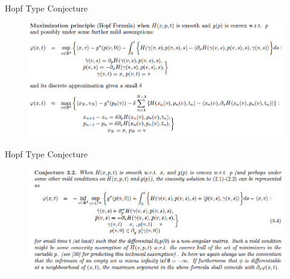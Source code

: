 \documentclass[english]{pkuslide}
\begin{document}
	\begin{frame}{Hopf  Type Conjecture}
\begin{figure}
\centering
\includegraphics[height=0.5\textheight]{3.png}
\end{figure}
	\end{frame}
\begin{frame}{Hopf Type Conjecture}
\begin{figure}
\centering
\includegraphics[height=0.5\textheight]{4.png}
\end{figure}

	\end{frame}
\end{document}
